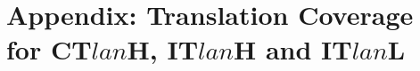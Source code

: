 \documentclass[a4paper,11pt]{article}
\begin{document}
	
	
	
	\section{Appendix: Translation Coverage for CT$lan$H, IT$lan$H and IT$lan$L}
	\label{ap:plural}
\end{document}
